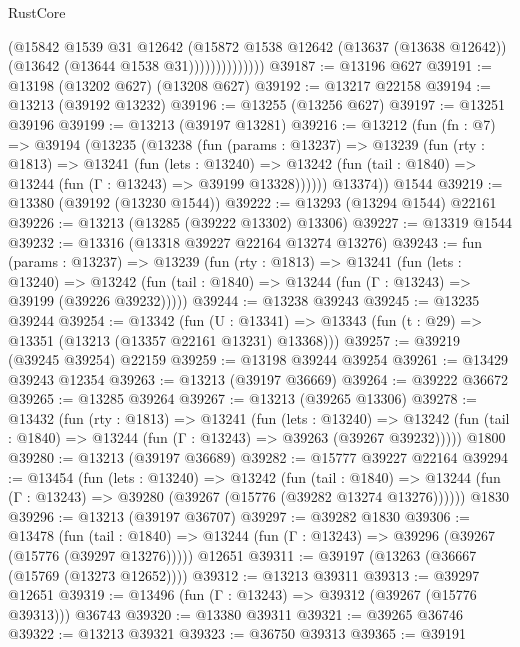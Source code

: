 \begin{lexlean}{RustCore}
\begin{coremodule}
                        (@15842
                          @1539
                          @31
                          @12642
                          (@15872
                            @1538
                            @12642
                            (@13637 (@13638 @12642))
                            (@13642 (@13644 @1538 @31))))))))))))))
@39187 := @13196 @627
@39191 := @13198 (@13202 @627) (@13208 @627)
@39192 := @13217 @22158
@39194 := @13213 (@39192 @13232)
@39196 := @13255 (@13256 @627)
@39197 := @13251 @39196
@39199 := @13213 (@39197 @13281)
@39216 := @13212
    (fun (fn : @7) =>
    @39194
      (@13235
        (@13238
          (fun (params : @13237) =>
          @13239
            (fun (rty : @1813) =>
            @13241
              (fun (lets : @13240) =>
              @13242 (fun (tail : @1840) => @13244 (fun (Γ : @13243) => @39199 @13328))))))
        @13374))
    @1544
@39219 := @13380 (@39192 (@13230 @1544))
@39222 := @13293 (@13294 @1544) @22161
@39226 := @13213 (@13285 (@39222 @13302) @13306)
@39227 := @13319 @1544
@39232 := @13316 (@13318 @39227 @22164 @13274 @13276)
@39243 := fun (params : @13237) =>
  @13239
    (fun (rty : @1813) =>
    @13241
      (fun (lets : @13240) =>
      @13242 (fun (tail : @1840) => @13244 (fun (Γ : @13243) => @39199 (@39226 @39232)))))
@39244 := @13238 @39243
@39245 := @13235 @39244
@39254 := @13342
    (fun (U : @13341) => @13343 (fun (t : @29) => @13351 (@13213 (@13357 @22161 @13231) @13368)))
@39257 := @39219 (@39245 @39254) @22159
@39259 := @13198 @39244 @39254
@39261 := @13429 @39243 @12354
@39263 := @13213 (@39197 @36669)
@39264 := @39222 @36672
@39265 := @13285 @39264
@39267 := @13213 (@39265 @13306)
@39278 := @13432
    (fun (rty : @1813) =>
    @13241
      (fun (lets : @13240) =>
      @13242 (fun (tail : @1840) => @13244 (fun (Γ : @13243) => @39263 (@39267 @39232)))))
    @1800
@39280 := @13213 (@39197 @36689)
@39282 := @15777 @39227 @22164
@39294 := @13454
    (fun (lets : @13240) =>
    @13242
      (fun (tail : @1840) =>
      @13244 (fun (Γ : @13243) => @39280 (@39267 (@15776 (@39282 @13274 @13276))))))
    @1830
@39296 := @13213 (@39197 @36707)
@39297 := @39282 @1830
@39306 := @13478
    (fun (tail : @1840) => @13244 (fun (Γ : @13243) => @39296 (@39267 (@15776 (@39297 @13276)))))
    @12651
@39311 := @39197 (@13263 (@36667 (@15769 (@13273 @12652))))
@39312 := @13213 @39311
@39313 := @39297 @12651
@39319 := @13496 (fun (Γ : @13243) => @39312 (@39267 (@15776 @39313))) @36743
@39320 := @13380 @39311
@39321 := @39265 @36746
@39322 := @13213 @39321
@39323 := @36750 @39313
@39365 := @39191

\end{coremodule}
\end{lexlean}
